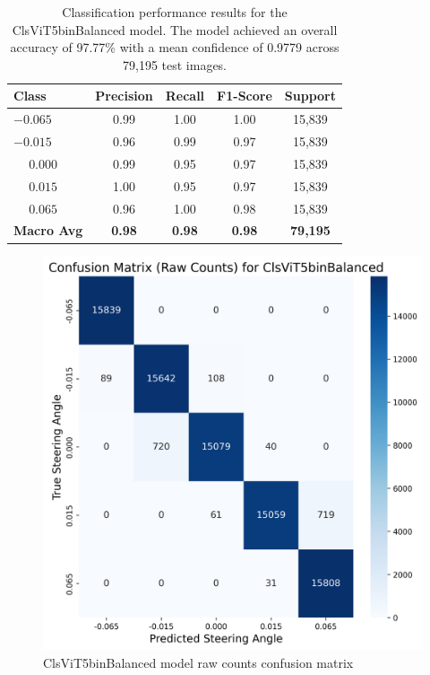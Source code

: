 \begin{table}[htbp]
\centering
\begin{tabular}{@{}lcccc@{}}
\toprule
\textbf{Class} & \textbf{Precision} & \textbf{Recall} & \textbf{F1-Score} & \textbf{Support} \\
\midrule
$-0.065$ & 0.99 & 1.00 & 1.00 & 15,839 \\
$-0.015$ & 0.96 & 0.99 & 0.97 & 15,839 \\
$\phantom{-}0.000$ & 0.99 & 0.95 & 0.97 & 15,839 \\
$\phantom{-}0.015$ & 1.00 & 0.95 & 0.97 & 15,839 \\
$\phantom{-}0.065$ & 0.96 & 1.00 & 0.98 & 15,839 \\
\midrule
\textbf{Macro Avg} & \textbf{0.98} & \textbf{0.98} & \textbf{0.98} & \textbf{79,195} \\
\bottomrule
\end{tabular}
\caption{Classification performance results for the ClsViT5binBalanced model. The model achieved an overall accuracy of 97.77\% with a mean confidence of 0.9779 across 79,195 test images.}
\label{tab:clf_report_ClsViT5binBalanced}
\end{table}


\begin{figure}[H]
\centering
\includegraphics[width=0.65\linewidth]{Figures/Results/cm_raw_ClsViT5binBalanced.png}
\caption{ClsViT5binBalanced model raw counts confusion matrix}
\label{fig:cm_raw_ClsViT5binBalanced}
\end{figure}


